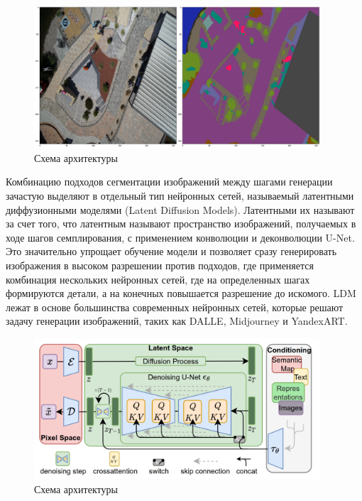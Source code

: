 \begin{figure}[H]
  \centering
  \includegraphics[width=0.95\textwidth]{img/conv.png}
  \caption{Схема архитектуры \cite{rombach2022high}}
    \label{fig:latent}
\end{figure}

Комбинацию подходов сегментации изображений между шагами генерации зачастую выделяют в отдельный тип нейронных сетей, называемый
латентными диффузионными моделями (Latent Diffusion Models). Латентными их называют за счет того, что латентным называют пространство
изображений, получаемых в ходе шагов семплирования, с применением конволюции и деконволюции U-Net. Это значительно
упрощает обучение модели и позволяет сразу генерировать изображения в высоком разрешении против подходов, где применяется
комбинация нескольких нейронных сетей, где на определенных шагах формируются детали, а на конечных повышается разрешение
до искомого.
LDM лежат в основе большинства современных нейронных сетей,
которые решают задачу генерации изображений, таких как DALLE, Midjourney и YandexART.
\begin{figure}[H]
  \centering
  \includegraphics[width=0.95\textwidth]{img/latent.png}
  \caption{Схема архитектуры \cite{rombach2022high}}
    \label{fig:latent}
\end{figure}

